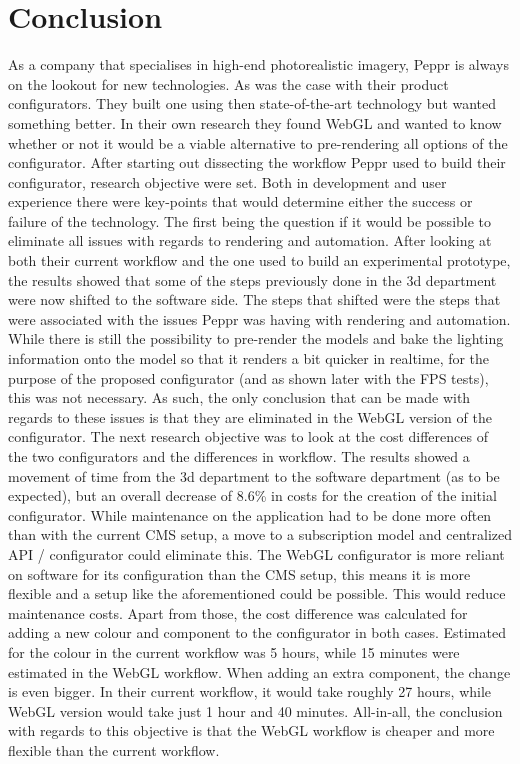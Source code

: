 \chapter{Conclusion}

As a company that specialises in high-end photorealistic imagery, Peppr is always on the lookout for new technologies. As was the case with their product configurators. They built one using then state-of-the-art technology but wanted something better. In their own research they found WebGL and wanted to know whether or not it would be a viable alternative to pre-rendering all options of the configurator. \newline
After starting out dissecting the workflow Peppr used to build their configurator, research objective were set. Both in development and user experience there were key-points that would determine either the success or failure of the technology. The first being the question if it would be possible to eliminate all issues with regards to rendering and automation. After looking at both their current workflow and the one used to build an experimental prototype, the results showed that some of the steps previously done in the 3d department were now shifted to the software side. The steps that shifted were the steps that were associated with the issues Peppr was having with rendering and automation. While there is still the possibility to pre-render the models and bake the lighting information onto the model so that it renders a bit quicker in realtime, for the purpose of the proposed configurator (and as shown later with the FPS tests), this was not necessary. As such, the only conclusion that can be made with regards to these issues is that they are eliminated in the WebGL version of the configurator.\newline
The next research objective was to look at the cost differences of the two configurators and the differences in workflow. The results showed a movement of time from the 3d department to the software department (as to be expected), but an overall decrease of 8.6\% in costs for the creation of the initial configurator. While maintenance on the application had to be done more often than with the current CMS setup, a move to a subscription model and centralized API / configurator could eliminate this. The WebGL configurator is more reliant on software for its configuration than the CMS setup, this means it is more flexible and a setup like the aforementioned could be possible. This would reduce maintenance costs. Apart from those, the cost difference was calculated for adding a new colour and component to the configurator in both cases. Estimated for the colour in the current workflow was 5 hours, while 15 minutes were estimated in the WebGL workflow. When adding an extra component, the change is even bigger. In their current workflow, it would take roughly 27 hours, while WebGL version would take just 1 hour and 40 minutes. All-in-all, the conclusion with regards to this objective is that the WebGL workflow is cheaper and more flexible than the current workflow.\newline

